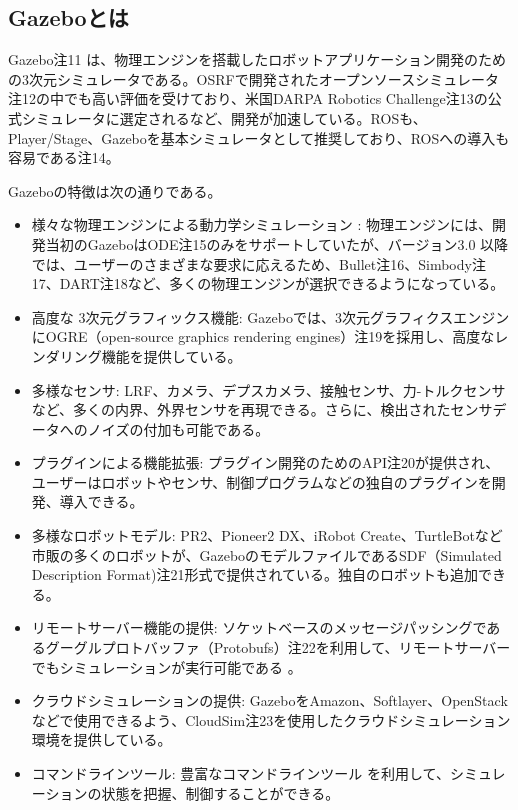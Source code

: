 \begin{itemize}
\subsection{Gazeboとは}

Gazebo注11 は、物理エンジンを搭載したロボットアプリケーション開発のための3次元シミュレータである。OSRFで開発されたオープンソースシミュレータ注12の中でも高い評価を受けており、米国DARPA Robotics Challenge注13の公式シミュレータに選定されるなど、開発が加速している。ROSも、Player/Stage、Gazeboを基本シミュレータとして推奨しており、ROSへの導入も容易である注14。

Gazeboの特徴は次の通りである。

\begin{itemize}
\item 様々な物理エンジンによる動力学シミュレーション  : 物理エンジンには、開発当初のGazeboはODE注15のみをサポートしていたが、バージョン3.0  以降では、ユーザーのさまざまな要求に応えるため、Bullet注16、Simbody注17、DART注18など、多くの物理エンジンが選択できるようになっている。
\item 高度な 3次元グラフィックス機能: Gazeboでは、3次元グラフィクスエンジンにOGRE（open-source graphics rendering engines）注19を採用し、高度なレンダリング機能を提供している。
\item  多様なセンサ:  LRF、カメラ、デプスカメラ、接触センサ、力-トルクセンサなど、多くの内界、外界センサを再現できる。さらに、検出されたセンサデータへのノイズの付加も可能である。
\item  プラグインによる機能拡張: プラグイン開発のためのAPI注20が提供され、ユーザーはロボットやセンサ、制御プログラムなどの独自のプラグインを開発、導入できる。
\item  多様なロボットモデル: PR2、Pioneer2 DX、iRobot Create、TurtleBotなど市販の多くのロボットが、GazeboのモデルファイルであるSDF（Simulated Description Format)注21形式で提供されている。独自のロボットも追加できる。
\item  リモートサーバー機能の提供: ソケットベースのメッセージパッシングであるグーグルプロトバッファ（Protobufs）注22を利用して、リモートサーバーでもシミュレーションが実行可能である  。
\item  クラウドシミュレーションの提供: GazeboをAmazon、Softlayer、OpenStackなどで使用できるよう、CloudSim注23を使用したクラウドシミュレーション環境を提供している。
\item コマンドラインツール: 豊富なコマンドラインツール  を利用して、シミュレーションの状態を把握、制御することができる。
\end{itemize}


\end{itemize}
